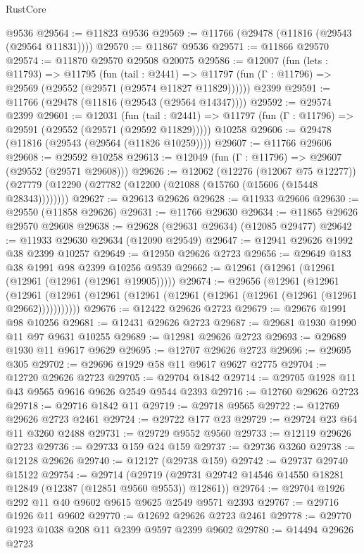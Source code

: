\begin{lexlean}{RustCore}
\begin{coremodule}
    @9536
@29564 := @11823 @9536
@29569 := @11766 (@29478 (@11816 (@29543 (@29564 @11831))))
@29570 := @11867 @9536
@29571 := @11866 @29570
@29574 := @11870 @29570 @29508 @20075
@29586 := @12007
    (fun (lets : @11793) =>
    @11795
      (fun (tail : @2441) =>
      @11797 (fun (Γ : @11796) => @29569 (@29552 (@29571 (@29574 @11827 @11829))))))
    @2399
@29591 := @11766 (@29478 (@11816 (@29543 (@29564 @14347))))
@29592 := @29574 @2399
@29601 := @12031
    (fun (tail : @2441) => @11797 (fun (Γ : @11796) => @29591 (@29552 (@29571 (@29592 @11829)))))
    @10258
@29606 := @29478 (@11816 (@29543 (@29564 (@11826 @10259))))
@29607 := @11766 @29606
@29608 := @29592 @10258
@29613 := @12049 (fun (Γ : @11796) => @29607 (@29552 (@29571 @29608)))
@29626 := @12062
    (@12276 (@12067 @75 @12277))
    (@27779 (@12290 (@27782 (@12200 (@21088 (@15760 (@15606 (@15448 @28343))))))))
@29627 := @29613 @29626
@29628 := @11933 @29606
@29630 := @29550 (@11858 @29626)
@29631 := @11766 @29630
@29634 := @11865 @29626 @29570 @29608
@29638 := @29628 (@29631 @29634) (@12085 @29477)
@29642 := @11933 @29630 @29634 (@12090 @29549)
@29647 := @12941 @29626 @1992 @38 @2399 @10257
@29649 := @12950 @29626 @2723
@29656 := @29649 @183 @38 @1991 @98 @2399 @10256 @9539
@29662 := @12961 (@12961 (@12961 (@12961 (@12961 (@12961 @19905)))))
@29674 := @29656
    (@12961
      (@12961
        (@12961 (@12961 (@12961 (@12961 (@12961 (@12961 (@12961 (@12961 (@12961 @29662)))))))))))
@29676 := @12422 @29626 @2723
@29679 := @29676 @1991 @98 @10256
@29681 := @12431 @29626 @2723
@29687 := @29681 @1930 @1990 @11 @97 @9631 @10255
@29689 := @12981 @29626 @2723
@29693 := @29689 @1930 @11 @9617 @9629
@29695 := @12707 @29626 @2723
@29696 := @29695 @305
@29702 := @29696 @1929 @58 @11 @9617 @9627 @2775
@29704 := @12720 @29626 @2723
@29705 := @29704 @1842
@29714 := @29705 @1928 @11 @43 @9565 @9616 @9626 @2549 @9544 @2393
@29716 := @12760 @29626 @2723
@29718 := @29716 @1842 @11
@29719 := @29718 @9565
@29722 := @12769 @29626 @2723 @2461
@29724 := @29722 @177 @23
@29729 := @29724 @23 @64 @11 @3260 @2488
@29731 := @29729 @9552 @9560
@29733 := @12119 @29626 @2723
@29736 := @29733 @159 @24 @159
@29737 := @29736 @3260
@29738 := @12128 @29626
@29740 := @12127 (@29738 @159)
@29742 := @29737 @29740 @15122
@29754 := @29714
    (@29719 (@29731 @29742 @14546 @14550 @18281 @12849 (@12387 (@12851 @9560 @9553)) @12861))
@29764 := @29704 @1926 @292 @11 @40 @9602 @9615 @9625 @2549 @9571 @2393
@29767 := @29716 @1926 @11 @9602
@29770 := @12692 @29626 @2723 @2461
@29778 := @29770 @1923 @1038 @208 @11 @2399 @9597 @2399 @9602
@29780 := @14494 @29626 @2723

\end{coremodule}
\end{lexlean}
